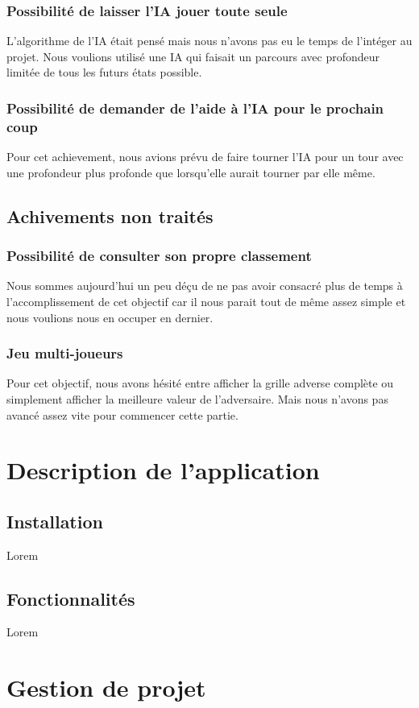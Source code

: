 \documentclass[a4paper,10pt]{report}
\begin{document}
    \section{Possibilité de laisser l'IA jouer toute seule}
      L'algorithme de l'IA était pensé mais nous n'avons pas eu le temps de l'intéger au projet. Nous voulions utilisé une IA qui faisait un parcours avec profondeur
      limitée de tous les futurs états possible.
    \section{Possibilité de demander de l'aide à l'IA pour le prochain coup}
      Pour cet achievement, nous avions prévu de faire tourner l'IA pour un tour avec une profondeur plus profonde que lorsqu'elle aurait tourner par elle même.
  \chapter{Achivements non traités}
    \section{Possibilité de consulter son propre classement}
      Nous sommes aujourd'hui un peu déçu de ne pas avoir consacré plus de temps à l'accomplissement de cet objectif car il nous parait tout de même assez simple et nous voulions nous en occuper en dernier.
    \section{Jeu multi-joueurs}
      Pour cet objectif, nous avons hésité entre afficher la grille adverse complète ou simplement afficher la meilleure valeur de l'adversaire. Mais nous n'avons pas avancé assez vite pour 
      commencer cette partie.
\part{Description de l'application}
  \chapter{Installation}
    Lorem
  \chapter{Fonctionnalités}
    Lorem
\part{Gestion de projet}
\end{document}
